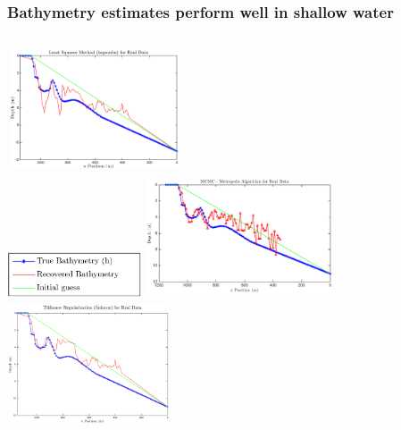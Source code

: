 \documentclass[7pt]{beamer}
\begin{document}
\begin{frame}
	\frametitle{Bathymetry estimates perform well in shallow water}
	   \begin{columns}[t]
        \centering
        \includegraphics[width=5.2cm,height=3.5cm]{img/lsqnonlin_real_data_oct09}\\
        \includegraphics[width=4.0cm,height=1.5cm]{img/legend_simulated.png}
        \centering
       \includegraphics[width=5.5cm,height=3.8cm]{img/MCMC-realdata-1000-nolabel}\\
       \includegraphics[width=4.8cm,height=3.5cm]{img/fmincon_real_data_oct09.png}
      \end{columns}
\end{frame}
\end{document}
